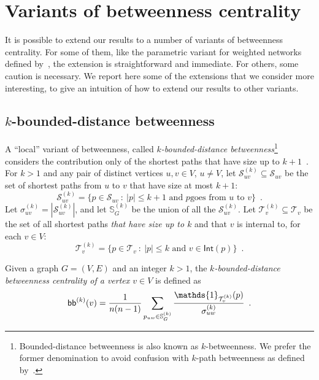 \ifproof
\section{Variants of betweenness centrality}\label{sec:variants}
It is possible to extend our results to a number of variants of betweenness
centrality. For some of them, like the parametric variant for weighted networks
defined by~\citet{OpsahlAS10}, the extension is straightforward and immediate. For
others, some caution is necessary. We report here some of the extensions that we
consider more interesting, to give an intuition of how to extend our results to
other variants.

\subsection{$k$-bounded-distance betweenness}
A ``local'' variant of betweenness, called \emph{$k$-bounded-distance
betweenness}\footnote{Bounded-distance betweenness is also known as
$k$-betweenness. We prefer the former denomination to avoid confusion with
$k$-path betweenness as defined by~\citet{KourtellisASIT12}.} considers
the contribution only of the shortest paths that have size up to $k+1$~\citep{BorgattiE06,Brandes08}.
For $k>1$ and any pair of distinct vertices $u,v\in V$, $u\neq V$, let
$\mathcal{S}^{(k)}_{uv}\subseteq\mathcal{S}_{uv}$ be the set of shortest paths
from $u$ to $v$ that have size at most $k+1$:
\[
	\mathcal{S}^{(k)}_{uv}=\{p\in\mathcal{S}_{uv} ~:~ |p|\le k+1 \mbox{ and $p$
	goes from $u$ to $v$}\}\enspace.
\]
Let $\sigma^{(k)}_{uv}=|\mathcal{S}^{(k)}_{uv}|$, and let $\mathbb{S}^{(k)}_G$
be the union of all the $\mathcal{S}^{(k)}_{uv}$. Let
$\mathcal{T}^{(k)}_v\subseteq\mathcal{T}_v$ be the set of all shortest paths
\emph{that have size up to $k$} and that $v$ is internal to, for each $v\in V$:
\[
	\mathcal{T}^{(k)}_v=\{p\in\mathcal{T}_v ~:~ |p|\le k \mbox{ and }
	v\in\mathsf{Int}(p)\}\enspace.
\]

\begin{definition}\label{def:kboundbetweenness}
  \citep{BorgattiE06,Brandes08} Given a graph $G=(V,E)$ and an integer $k>1$,
  the \emph{$k$-bounded-distance betweenness centrality of a vertex $v\in V$} is
  defined as
  \[
  \kboundbetw^{(k)}(v)=\frac{1}{n(n-1)}\sum_{p_{uw}\in\mathbb{S}^{(k)}_G}\frac{\mathds{1}_{\mathcal{T}^{(k)}_v}(p)}{\sigma^{(k)}_{uw}}
  \enspace.
  \]
\end{definition}

